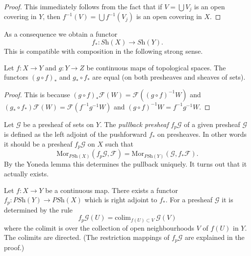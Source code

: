 \begin{proof}
This immediately follows from the fact that
if $V = \bigcup V_j$ is an open covering in $Y$,
then $f^{-1}(V) = \bigcup f^{-1}(V_j)$ is an open covering in $X$.
\end{proof}

\noindent
As a consequence we obtain a functor
$$
f_* : \textit{Sh}(X) \longrightarrow \textit{Sh}(Y).
$$
This is compatible with composition in the following
strong sense.

\begin{lemma}
\label{lemma-pushforward-composition}
Let $f : X \to Y$ and $g : Y \to Z$ be continuous maps
of topological spaces. The functors $(g \circ f)_*$
and $g_* \circ f_*$ are equal (on both presheaves
and sheaves of sets).
\end{lemma}

\begin{proof}
This is because $(g \circ f)_*\mathcal{F}(W) =
\mathcal{F}((g \circ f)^{-1}W)$ and
$(g_* \circ f_*)\mathcal{F}(W) = \mathcal{F}(f^{-1} g^{-1} W)$
and $(g \circ f)^{-1}W = f^{-1} g^{-1} W$.
\end{proof}

\noindent
Let $\mathcal{G}$ be a presheaf of sets on $Y$.
The {\it pullback presheaf} $f_p\mathcal{G}$
of a given presheaf $\mathcal{G}$ is defined as the left adjoint
of the pushforward $f_*$ on presheaves. In other words it
should be a presheaf $f_p \mathcal{G}$ on $X$ such that
$$
\text{Mor}_{\textit{PSh}(X)}(f_p\mathcal{G}, \mathcal{F})
=
\text{Mor}_{\textit{PSh}(Y)}(\mathcal{G}, f_*\mathcal{F}).
$$
By the Yoneda lemma this determines the pullback uniquely.
It turns out that it actually exists.

\begin{lemma}
\label{lemma-pullback-presheaves}
Let $f : X \to Y$ be a continuous map.
There exists a functor
$f_p : \textit{PSh}(Y) \to \textit{PSh}(X)$
which is right adjoint to $f_*$. For a presheaf
$\mathcal{G}$ it is determined by the rule
$$
f_p\mathcal{G}(U) = \text{colim}_{f(U) \subset V}\ \mathcal{G}(V)
$$
where the colimit is over the collection of open neighbourhoods
$V$ of $f(U)$ in $Y$. The colimits are directed. (The restriction
mappings of $f_p\mathcal{G}$ are explained in the proof.)
\end{lemma}

